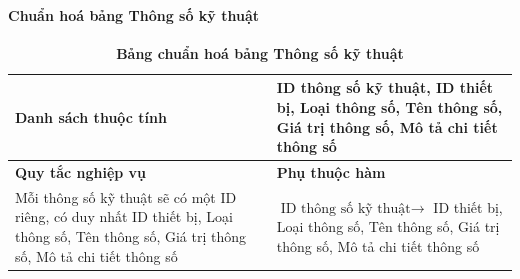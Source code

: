 \paragraph{Chuẩn hoá bảng Thông số kỹ thuật}
\mbox{}
\begin{table}[H]
	\caption{\bfseries \fontsize{12pt}{0pt}\selectfont Bảng chuẩn hoá bảng Thông số kỹ thuật}
	\centering
	\begin{tabularx}{0.9\textwidth}{|X|X|}
		\hline
		\textbf{Danh sách thuộc tính} & ID thông số kỹ thuật, ID thiết bị, Loại thông số, Tên thông số, Giá trị thông số, Mô tả chi tiết thông số                                             \\
		\hline
		\textbf{Quy tắc nghiệp vụ}    & \textbf{Phụ thuộc hàm}                                                                                                                                \\
		\hline
		Mỗi thông số kỹ thuật sẽ có một ID riêng, có duy nhất ID thiết bị, Loại thông số, Tên thông số, Giá trị thông số, Mô tả chi tiết thông số
		                              & \parbox[t]{\linewidth}{$\text{ID thông số kỹ thuật} \rightarrow$ ID thiết bị, Loại thông số, Tên thông số, Giá trị thông số, Mô tả chi tiết thông số} \\
		\hline
		                                                                                                  \\
		                                                                                                            \\
		\hline
	\end{tabularx}
\end{table}

